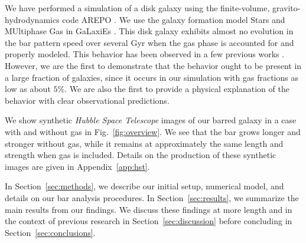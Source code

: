 \documentclass[fleqn,usenatbib]{mnras}
\newcommand{\RCR}{\ensuremath{R_{\textrm{CR}}}}
\newcommand{\Rot}{\ensuremath{\mathcal{R}}}
\newcommand{\AREPO}{\textsc{AREPO}}
\begin{document}
We have performed a simulation of a disk galaxy using the finite-volume,
gravito-hydrodynamics code \AREPO{} \citep{2010MNRAS.401..791S}. We use the galaxy
formation model Stars and MUltiphase Gas in GaLaxiEs
\citep[SMUGGLE;][]{2019MNRAS.489.4233M}. This disk galaxy exhibits almost no
evolution in the bar pattern speed over several Gyr when the gas phase is
accounted for and properly modeled. This behavior has been observed in a few
previous works \citep{1993AA...268...65F, 2010ApJ...719.1470V,
2014MNRAS.438L..81A}. However, we are the first to demonstrate that the behavior
ought to be present in a large fraction of galaxies, since it occurs in our
simulation with gas fractions as low as about $5\%$. We are also the first to
provide a physical explanation of the behavior with clear observational
predictions.

We show synthetic \textit{Hubble Space Telescope} images of our barred galaxy in
a case with and without gas in Fig.~\ref{fig:overview}. We see that the bar
grows longer and stronger without gas, while it remains at approximately the
same length and strength when gas is included. Details on the production of
these synthetic images are given in Appendix~\ref{app:hst}.


In Section~\ref{sec:methods}, we describe our initial setup, numerical model,
and details on our bar analysis procedures. In Section~\ref{sec:results}, we
summarize the main results from our findings. We discuss these findings at more
length and in the context of previous research in Section~\ref{sec:discussion}
before concluding in Section~\ref{sec:conclusions}.

\end{document}
